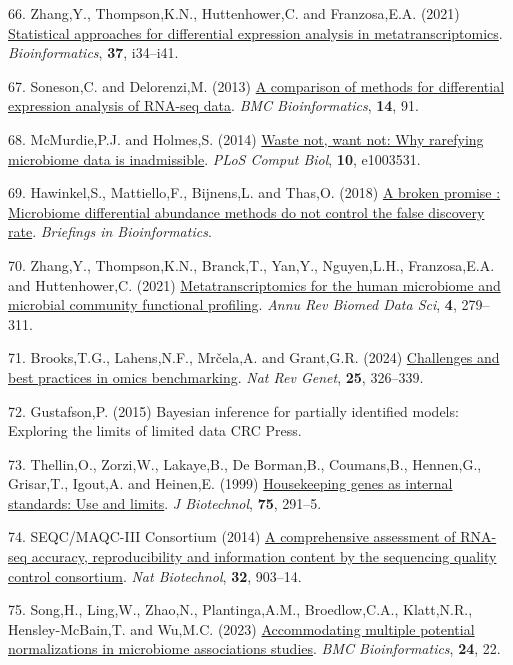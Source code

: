 \documentclass[
]{article}
\newlength{\cslhangindent}
\newenvironment{CSLReferences}[2] %
 {\begin{list}{}{%
  \setlength{\itemindent}{0pt}
  \setlength{\leftmargin}{0pt}
  \setlength{\parsep}{0pt}
  \ifodd #1
   \setlength{\leftmargin}{\cslhangindent}
   \setlength{\itemindent}{-1\cslhangindent}
  \fi
  \setlength{\itemsep}{#2\baselineskip}}}
 {\end{list}}
\begin{document}
\begin{CSLReferences}{1}{1}
66. Zhang,Y., Thompson,K.N., Huttenhower,C. and Franzosa,E.A. (2021)
\href{https://doi.org/10.1093/bioinformatics/btab327}{Statistical
approaches for differential expression analysis in metatranscriptomics}.
\emph{Bioinformatics}, \textbf{37}, i34--i41.

67. Soneson,C. and Delorenzi,M. (2013)
\href{https://doi.org/10.1186/1471-2105-14-91}{A comparison of methods
for differential expression analysis of {RNA-seq} data}. \emph{BMC
Bioinformatics}, \textbf{14}, 91.

68. McMurdie,P.J. and Holmes,S. (2014)
\href{https://doi.org/10.1371/journal.pcbi.1003531}{Waste not, want not:
Why rarefying microbiome data is inadmissible}. \emph{PLoS Comput Biol},
\textbf{10}, e1003531.

69. Hawinkel,S., Mattiello,F., Bijnens,L. and Thas,O. (2018)
\href{http://dx.doi.org/10.1093/bib/bbx104}{A broken promise :
Microbiome differential abundance methods do not control the false
discovery rate}. \emph{Briefings in Bioinformatics}.

70. Zhang,Y., Thompson,K.N., Branck,T., Yan,Y., Nguyen,L.H.,
Franzosa,E.A. and Huttenhower,C. (2021)
\href{https://doi.org/10.1146/annurev-biodatasci-031121-103035}{Metatranscriptomics
for the human microbiome and microbial community functional profiling}.
\emph{Annu Rev Biomed Data Sci}, \textbf{4}, 279--311.

71. Brooks,T.G., Lahens,N.F., Mrčela,A. and Grant,G.R. (2024)
\href{https://doi.org/10.1038/s41576-023-00679-6}{Challenges and best
practices in omics benchmarking}. \emph{Nat Rev Genet}, \textbf{25},
326--339.

72. Gustafson,P. (2015) Bayesian inference for partially identified
models: Exploring the limits of limited data CRC Press.

73. Thellin,O., Zorzi,W., Lakaye,B., De Borman,B., Coumans,B.,
Hennen,G., Grisar,T., Igout,A. and Heinen,E. (1999)
\href{https://www.ncbi.nlm.nih.gov/pubmed/10617337}{Housekeeping genes
as internal standards: Use and limits}. \emph{J Biotechnol},
\textbf{75}, 291--5.

74. SEQC/MAQC-III Consortium (2014)
\href{https://doi.org/10.1038/nbt.2957}{A comprehensive assessment of
RNA-seq accuracy, reproducibility and information content by the
sequencing quality control consortium}. \emph{Nat Biotechnol},
\textbf{32}, 903--14.

75. Song,H., Ling,W., Zhao,N., Plantinga,A.M., Broedlow,C.A.,
Klatt,N.R., Hensley-McBain,T. and Wu,M.C. (2023)
\href{https://doi.org/10.1186/s12859-023-05147-w}{Accommodating multiple
potential normalizations in microbiome associations studies}. \emph{BMC
Bioinformatics}, \textbf{24}, 22.

\end{CSLReferences}
\end{document}
